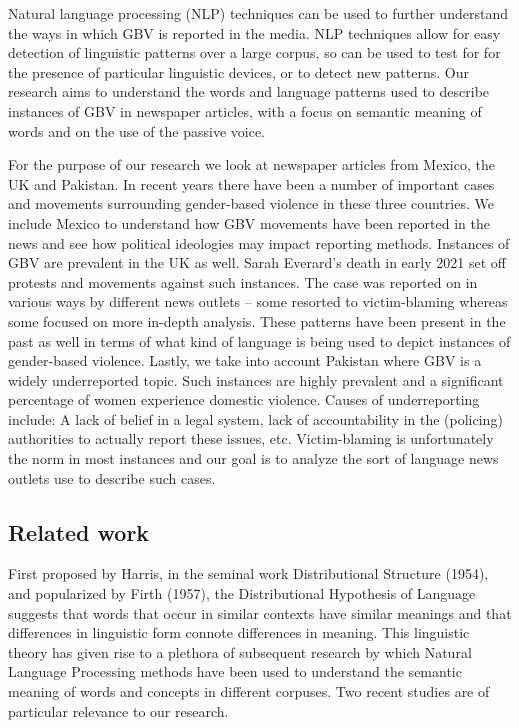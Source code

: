 \documentclass{article}
\begin{document}
{Natural language processing (NLP) techniques can be used to further understand the ways in which GBV is reported in the media. NLP techniques allow for easy detection of linguistic patterns over a large corpus, so can be used to test for for the presence of particular linguistic devices, or to detect new patterns. Our research aims to understand the words and language patterns used to describe instances of GBV in newspaper articles, with a focus on semantic meaning of words and on the use of the passive voice. 

For the purpose of our research we look at newspaper articles from Mexico, the UK and Pakistan. In recent years there have been a number of important cases and movements surrounding gender-based violence in these three countries. We include Mexico to understand how GBV movements have been reported in the news and see how political ideologies may impact reporting methods. Instances of GBV are prevalent in the UK as well. Sarah Everard's death in early 2021 set off protests and movements against such instances. The case was reported on in various ways by different news outlets – some resorted to victim-blaming whereas some focused on more in-depth analysis. These patterns have been present in the past as well in terms of what kind of language is being used to depict instances of gender-based violence. Lastly, we take into account Pakistan where GBV is a widely underreported topic. Such instances are highly prevalent and a significant percentage of women experience domestic violence. Causes of underreporting include: A lack of belief in a legal system, lack of accountability in the (policing) authorities to actually report these issues, etc. Victim-blaming is unfortunately the norm in most instances and our goal is to analyze the sort of language news outlets use to describe such cases.

\subsection{Related work}{
First proposed by Harris, in the seminal work Distributional Structure (1954),  and popularized by Firth (1957), the Distributional Hypothesis of Language suggests that words that occur in similar contexts have similar meanings and that differences in linguistic form connote differences in meaning. This linguistic theory has given rise to a plethora of subsequent research by which Natural Language Processing methods have been used to understand the semantic meaning of words and concepts in different corpuses. Two recent studies are of particular relevance to our research.
	
}}
\end{document}
